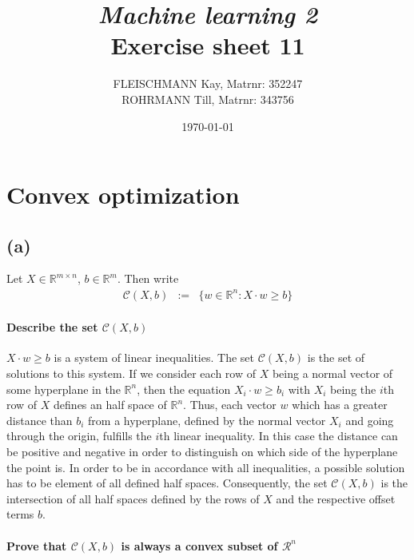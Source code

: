 \documentclass[a4paper, 11pt, titlepage]{article}
\title
{{\em Machine learning 2}\\
Exercise sheet 11}
\author{FLEISCHMANN Kay, Matrnr: 352247\\
	ROHRMANN Till, Matrnr: 343756}
\date{\today}
\begin{document}
\maketitle

\setcounter{section}{19}
\section{Convex optimization}

\subsection*{(a)}

Let $X\in \mathbb{R}^{m\times n}$, $b\in \mathbb{R}^m$. Then write
\begin{eqnarray*}
	\mathcal{C}(X,b)&:=& \{w\in\mathbb{R}^n : X\cdot w \ge b \}
\end{eqnarray*}

\paragraph{Describe the set $\mathcal{C}(X,b)$}
$X\cdot w \ge b$ is a system of linear inequalities.
The set $\mathcal{C}(X,b)$ is the set of solutions to this system.
If we consider each row of $X$ being a normal vector of some hyperplane in the $\mathbb{R}^n$, then the equation $X_i\cdot w \ge b_i$ with $X_i$ being the $i$th row of $X$ defines an half space of $\mathbb{R}^n$.
Thus, each vector $w$ which has a greater distance than $b_i$ from a hyperplane, defined by the normal vector $X_i$ and going through the origin, fulfills the $i$th linear inequality.
In this case the distance can be positive and negative in order to distinguish on which side of the hyperplane the point is.
In order to be in accordance with all inequalities, a possible solution has to be element of all defined half spaces.
Consequently, the set $\mathcal{C}(X,b)$ is the intersection of all half spaces defined by the rows of $X$ and the respective offset terms $b$.

\paragraph{Prove that $\mathcal{C}(X,b)$ is always a convex subset of $\mathcal{R}^n$}
\end{document}
